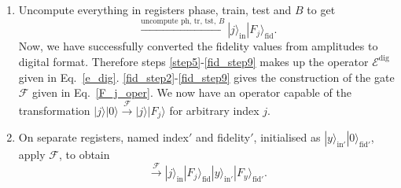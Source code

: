 \documentclass[a4paper,twocolumn,11pt,unpublished]{quantumarticle}
\newcommand{\rang}{\rangle}
\begin{document}
\begin{enumerate}
            \item \label{fid_step9} Uncompute everything in registers phase, train, test and $B$ to get
            \begin{equation}
                \xrightarrow {\text{uncompute ph, tr, tst, } B} |j\rang_\text{in} |F_j\rang_\text{fid}.
            \end{equation} 
            Now, we have successfully converted the fidelity values from amplitudes to digital format. Therefore steps \ref{step5}-\ref{fid_step9} makes up the operator $\mathcal{E}^\text{dig}$ given in Eq.~\eqref{e_dig}. \ref{fid_step2}-\ref{fid_step9} gives the construction of the gate $\mathcal F$ given in Eq.~\eqref{F_j_oper}. We now have an operator capable of the transformation
            $    |j\rang |0\rang \xrightarrow {\mathcal F} |j\rang |F_j\rang$ 
            for arbitrary index $j$.
            \item On separate registers, named index$'$ and fidelity$'$, initialised as $|y\rang_{\text{in}'}|0\rang_{\text{fid}'} $, apply $\mathcal F$, to obtain
            \begin{equation}
                \xrightarrow {\mathcal F} |j\rang_\text{in} |F_j\rang_\text{fid} |y\rang_{\text{in}'} |F_y\rang_{\text{fid}'}.   
            \end{equation}
            

\end{enumerate}
\end{document}
